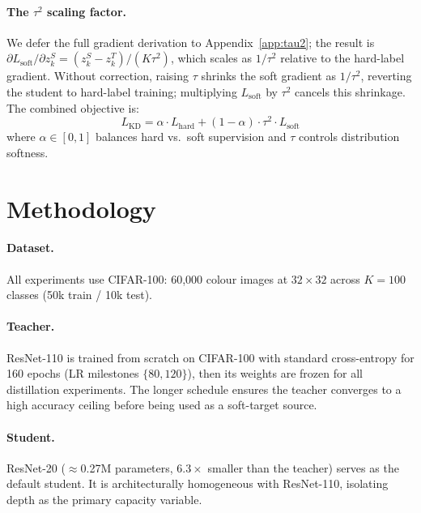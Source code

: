 \documentclass{article}
\theoremstyle{plain}
\theoremstyle{definition}
\theoremstyle{remark}
\begin{document}
\paragraph{The $\tau^2$ scaling factor.}
We defer the full gradient derivation to Appendix~\ref{app:tau2}; the result is $\partial L_{\mathrm{soft}}/\partial z_k^S = (z_k^S - z_k^T)/(K\tau^2)$, which scales as $1/\tau^2$ relative to the hard-label gradient. Without correction, raising $\tau$ shrinks the soft gradient as $1/\tau^2$, reverting the student to hard-label training; multiplying $L_{\mathrm{soft}}$ by $\tau^2$ cancels this shrinkage. The combined objective is:
%
\begin{equation}
  \boxed{
  L_{\mathrm{KD}}
    = \alpha \cdot L_{\mathrm{hard}}
    + (1-\alpha)\cdot\tau^2 \cdot L_{\mathrm{soft}}
  }
  \label{eq:lkd}
\end{equation}
where $\alpha \in [0,1]$ balances hard vs.\ soft supervision and $\tau$ controls distribution softness.

\section{Methodology}
\label{sec:method}

\paragraph{Dataset.} All experiments use CIFAR-100: 60{,}000 colour images at $32{\times}32$ across $K=100$ classes (50k train / 10k test).

\paragraph{Teacher.} ResNet-110 \citep{he2016deep} is trained from scratch on CIFAR-100 with standard cross-entropy for 160 epochs (LR milestones $\{80, 120\}$), then its weights are frozen for all distillation experiments. The longer schedule ensures the teacher converges to a high accuracy ceiling before being used as a soft-target source.

\paragraph{Student.} ResNet-20 \citep{he2016deep} ($\approx$0.27M parameters, $6.3\times$ smaller than the teacher) serves as the default student. It is architecturally homogeneous with ResNet-110, isolating depth as the primary capacity variable.
\end{document}
